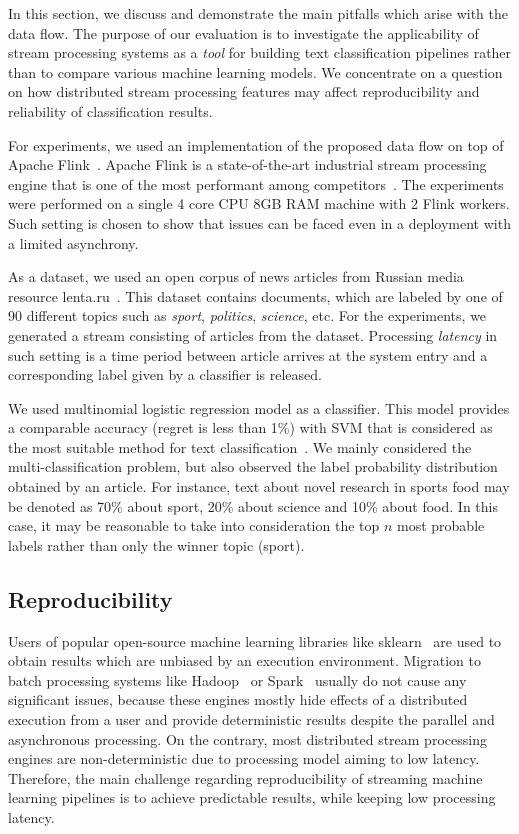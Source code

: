 \label {fs-discussion}

In this section, we discuss and demonstrate the main pitfalls which arise with the data flow. The purpose of our evaluation is to investigate the applicability of stream processing systems as a {\em tool} for building text classification pipelines rather than to compare various machine learning models. We concentrate on a question on how distributed stream processing features may affect reproducibility and reliability of classification results.

For experiments, we used an implementation of the proposed data flow on top of Apache Flink~\cite{Carbone:2017:SMA:3137765.3137777}. Apache Flink is a state-of-the-art industrial stream processing engine that is one of the most performant among competitors~\cite{karimov2018benchmarking, S7530084}. The experiments were performed on a single 4 core CPU 8GB RAM machine with 2 Flink workers. Such setting is chosen to show that issues can be faced even in a deployment with a limited asynchrony. 

As a dataset, we used an open corpus of news articles from Russian media resource lenta.ru~\cite{lentaru}. This dataset contains documents, which are labeled by one of 90 different topics such as {\em sport}, {\em politics}, {\em science}, etc. For the experiments, we generated a stream consisting of articles from the dataset. Processing {\em latency} in such setting is a time period between article arrives at the system entry and a corresponding label given by a classifier is released. 

We used multinomial logistic regression model as a classifier. This model provides a comparable accuracy (regret is less than 1\%) with SVM that is considered as the most suitable method for text classification~\cite{Kuralenok:2018:CEV:3269206.3271789}. We mainly considered the multi-classification problem, but also observed the label probability distribution obtained by an article. For instance, text about novel research in sports food may be denoted as 70\% about sport, 20\% about science and 10\% about food. In this case, it may be reasonable to take into consideration the top $n$ most probable labels rather than only the winner topic (sport).

\subsection{Reproducibility}

Users of popular open-source machine learning libraries like sklearn~\cite{sklearn_api} are used to obtain results which are unbiased by an execution environment. Migration to batch processing systems like Hadoop~\cite{hadoop2009hadoop} or Spark~\cite{Zaharia:2016:ASU:3013530.2934664} usually do not cause any significant issues, because these engines mostly hide effects of a distributed execution from a user and provide deterministic results despite the parallel and asynchronous processing. On the contrary, most distributed stream processing engines are non-deterministic due to processing model aiming to low latency. Therefore, the main challenge regarding reproducibility of streaming machine learning pipelines is to achieve predictable results, while keeping low processing latency.

